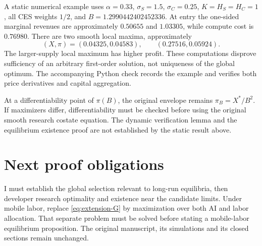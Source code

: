 \documentclass[11pt]{article}
\begin{document}
A static numerical example uses $\alpha=0.33$, $\sigma_S=1.5$,
$\sigma_C=0.25$, $K=H_S=H_C=1$, all CES weights $1/2$, and
$B=1.2990442402452336$. At entry the one-sided marginal revenues are
approximately $0.50655$ and $1.03305$, while compute cost is $0.76980$.
There are two smooth local maxima, approximately
\[
 (X,\pi)=(0.04325,0.04583),\qquad (0.27516,0.05924).
\]
The larger-supply local maximum has higher profit. These computations
disprove sufficiency of an arbitrary first-order solution, not uniqueness
of the global optimum. The accompanying Python check records the example
and verifies both price derivatives and capital aggregation.

At a differentiability point of $\pi(B)$, the original envelope remains
$\pi_B=X^*/B^2$. If maximizers differ, differentiability must be checked
before using the original smooth research costate equation.
The dynamic verification lemma and the equilibrium existence proof are
not established by the static result above.

\section{Next proof obligations}
I must establish the global selection relevant to long-run equilibria,
then developer research optimality and existence near the candidate limits.
Under mobile labor, replace \eqref{eq:extension-G} by maximization over
both AI and labor allocation. That separate problem must be solved before
stating a mobile-labor equilibrium proposition. The original manuscript,
its simulations and its closed sections remain unchanged.
\end{document}
